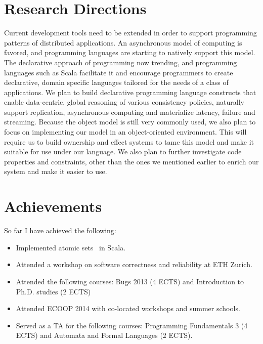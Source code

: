 \documentclass[]{usiinfprospectus}
\begin{document}
\section{Research Directions}
Current development tools need to be extended in order to support programming patterns of distributed applications. An asynchronous model of computing is favored, and programming languages are starting to natively support this model. The declarative approach of programming now trending, and programming languages such as Scala facilitate it and encourage programmers to create declarative, domain specific languages tailored for the needs of a class of applications. We plan to build declarative programming language constructs that enable data-centric, global reasoning of various consistency policies, naturally support replication, asynchronous computing and materialize latency, failure and streaming. Because the object model is still very commonly used, we also plan to focus on implementing our model in an object-oriented environment. This will require us to build ownership and effect systems to tame this model and make it suitable for use under our language. We also plan to further investigate code properties and constraints, other than the ones we mentioned earlier to enrich our system and make it easier to use. 

\section{Achievements}
So far I have achieved the following:
\begin{itemize}
	\item Implemented atomic sets~\cite{dolby2012data} in Scala.
	\item Attended a workshop on software correctness and reliability at ETH Zurich.
	\item Attended the following courses: Bugs 2013 (4 ECTS) and Introduction to Ph.D. studies (2 ECTS) 
	\item Attended ECOOP 2014 with co-located workshops and summer schools.
	\item Served as a TA for the following courses: Programming Fundamentals 3 (4 ECTS) and Automata and Formal Languages (2 ECTS). 
\end{itemize}

\end{document}
